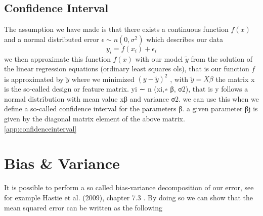 \documentclass[twoside,11pt]{report}
\begin{document}
\subsection{Confidence Interval}
\label{sec:confidenceinterval}

The assumption we have made is that there exists a continuous function $f (x)$
and a normal distributed error $\epsilon \sim n (0, \sigma^2)$ which describes our data
$$ y_i = f (x_i) + \epsilon_i$$
we then approximate this function $f(x)$ with our model $\tilde{y}$ from the solution
of the linear regression equations (ordinary least squares ols), that is our
function $f$ is approximated by $\tilde{y}$ where we minimized $(y - \tilde{y})^2$ , with
$\tilde{y} = X\beta$
the matrix x is the so-called design or feature matrix.
yi ∼ n (xi,∗ β, σ2), that is y follows a normal distribution with mean
value xβ and variance σ2.
we can use this when we define a so-called confidence interval
for the parameters β. a given parameter βj is given by the diagonal matrix
element of the above matrix.
\ref{app:confidenceinterval}







\section{Bias \& Variance}
\label{sec:biasvariance}

It is possible to perform a so called bias-variance decomposition of our error, 
see for example Hastie et al. (2009), chapter 7.3 \cite{hastie01statisticallearning}.
By doing so we can show that the mean squared error can be written as the following
\end{document}
